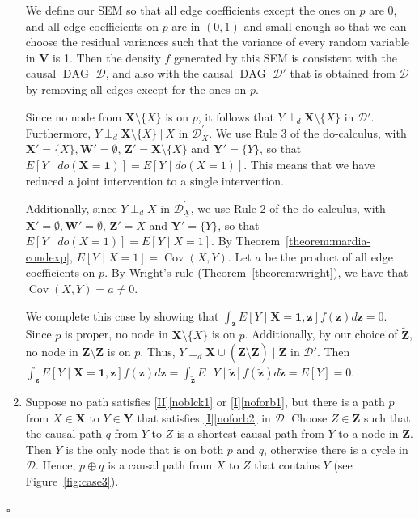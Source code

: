 \documentclass[11pt,a4paper]{article}
\newcommand\given[1][]{\:#1\vert\:}
\newcommand{\dsepp}{\perp_{d}}
\newenvironment{proofof}[1][]{\begin{trivlist}
   \item[\hskip \labelsep {\bfseries Proof of #1.}]}{\hfill{}$\square$\end{trivlist}}
\DeclareMathOperator{\Cov}{Cov}
\DeclareMathOperator{\DAG}{DAG}
\newcommand{\g}[1][G]{\mathcal{#1}}
\begin{document}
\begin{proofof}[Theorem~\ref{theorem:completeness ac}]
\begin{enumerate}[label=(\roman*)]
We define our SEM so that all edge coefficients except the ones on $p$ are $0$, and all edge coefficients  on $p$ are in $(0,1)$ and small enough so that we can choose the residual variances such that the variance of every random variable in $\mathbf{V}$ is 1. Then the density $f$ generated by this SEM is consistent with the causal $\DAG$ $\g[D]$, and also with the causal $\DAG$ $\g[D']$ that is obtained from $\g[D]$ by removing all edges except for the ones on $p$. 

Since no node from $\mathbf{X} \setminus \{X\}$ is on $p$, it follows that $Y \dsepp \mathbf{X}\setminus \{X\} $ in $\g[D']$. Furthermore,  $Y \dsepp \mathbf{X}\setminus \{X\} \given X $ in $\g[D]^{'}_{\overline{X}}$.
We use Rule 3 of the do-calculus, with $\mathbf{X'} = \{X\}, \mathbf{W'} = \emptyset$, $\mathbf{Z'} = \mathbf{X}\setminus \{X\}$ and $\mathbf{Y'} = \{Y\}$, so that $E[ Y \mid do(\mathbf{X}=\mathbf{1})]= E[ Y \mid do(X=1)]$. This means that we have reduced a joint intervention to a single intervention. 

Additionally, since $Y \dsepp X $ in $\g[D]^{'}_{\underline{X}}$, we use Rule 2 of the do-calculus, with $\mathbf{X'} = \emptyset, \mathbf{W'} = \emptyset$, $\mathbf{Z'} = X$ and $\mathbf{Y'} = \{Y\}$, so that $E[ Y \mid do(X=1)]= E[ Y \mid X=1]$. By Theorem~\ref{theorem:mardia-condexp}, $E[ Y \mid X=1] = \Cov(X,Y)$. Let $a$ be the product of all edge coefficients  on $p$. By Wright's rule (Theorem~\ref{theorem:wright}), we have that $\Cov(X,Y) = a \neq 0$.

We complete this case by showing that $\int_\mathbf{z} E[ Y \mid \mathbf{X}=\mathbf{1},\mathbf{z}]f(\mathbf{z})d\mathbf{z}  =0$. Since $p$ is proper, no node in $\mathbf{X} \setminus \{X\}$ is on $p$. Additionally, by our choice of $\mathbf{\tilde{Z}}$, no node in $\mathbf{Z} \setminus  \mathbf{\tilde{Z}}$ is on $p$. Thus, $Y \dsepp \mathbf{X} \cup (\mathbf{Z} \setminus \mathbf{\tilde{Z}}) \mid \mathbf{\tilde{Z}}$ in $\g[D']$. Then $\int_\mathbf{z} E[ Y \mid \mathbf{X}=\mathbf{1},\mathbf{z}]f(\mathbf{z})d\mathbf{z} = \int_{\mathbf{\tilde{z}}}E[ Y \mid \mathbf{\tilde{z}}]f(\mathbf{\tilde{z}})d\mathbf{\tilde{z}} = E[Y]=0$. 

\item\label{case3} Suppose no path satisfies \ref{II}\ref{noblck1} or \ref{I}\ref{noforb1}, but there is a path $p$ from $X \in \mathbf{X}$ to $Y \in \mathbf{Y}$ that satisfies \ref{I}\ref{noforb2} in $\g[D]$. Choose $Z \in \mathbf{Z}$ such that the causal path $q$ from $Y$ to $Z$ is a shortest causal path from $Y$ to a node in $\mathbf{Z}$. Then $Y$ is the only node that is on both $p$ and $q$, otherwise there is a cycle in $\g[D]$. Hence, $p \oplus q$ is a causal path from $X$ to $Z$ that contains $Y$ (see Figure~\ref{fig:case3}).


\end{enumerate}
\end{proofof}
\end{document}
